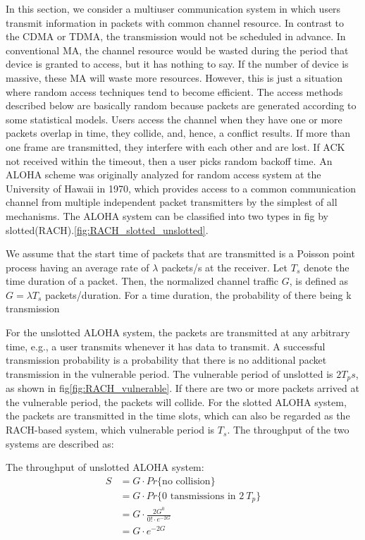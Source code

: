 In this section, we consider a multiuser communication system in which users transmit information in packets with common channel resource. In contrast to the CDMA or TDMA, the transmission would not be scheduled in advance. In conventional MA, the channel resource would be wasted during the period that device is granted to access, but it has nothing to say. If the number of device is massive, these MA will waste more resources. However, this is just a situation where random access techniques tend to become efficient. The access methods described below are basically random because packets are generated according to some statistical models. Users access the channel when they have one or more packets overlap in time, they collide, and, hence, a conflict results. If more than one frame are transmitted, they interfere with each other and are lost. If ACK not received within the timeout, then a user picks random backoff time. An ALOHA scheme \cite{abramson1970aloha} was originally analyzed for random access system at the University of Hawaii in 1970, which provides access to a common communication channel from multiple independent packet transmitters by the simplest of all mechanisms. The ALOHA system can be classified into two types in fig by slotted(RACH).\ref{fig:RACH_slotted_unslotted}.

We assume that the start time of packets that are transmitted is a Poisson point process having an average rate of $\lambda$ packets/s at the receiver.
Let $T_s$ denote the time duration of a packet. Then, the normalized channel traffic $G$, is defined as $G = \lambda T_s$ packets/duration.
For a time duration, the probability  of there being k transmission 


For the unslotted ALOHA system, the packets are transmitted at any arbitrary time, e.g., a user transmits whenever it has data to transmit. A successful transmission probability is a probability that there is no additional packet transmission in the vulnerable period. The vulnerable period of unslotted is $2T_ps$, as shown in fig\ref{fig:RACH_vulnerable}. If there are two or more packets arrived at the vulnerable period, the packets will collide. For the slotted ALOHA system, the packets are transmitted in the time slots, which can also be regarded as the RACH-based system, which vulnerable period is $T_s$. The throughput of the two systems are described as:


	
The throughput of unslotted ALOHA system:	
\begin{align}
S &= G \cdot Pr \{ \text{no collision} \}  \nonumber \\
  &= G \cdot Pr \{ \text{0 tansmissions in 2} \ T_p \} \nonumber \\
  &= G \cdot \frac{{2G}^{0}}{0! \cdot e^{-2G}} \nonumber \\
  &= G \cdot e^{-2G}
\end{align}

